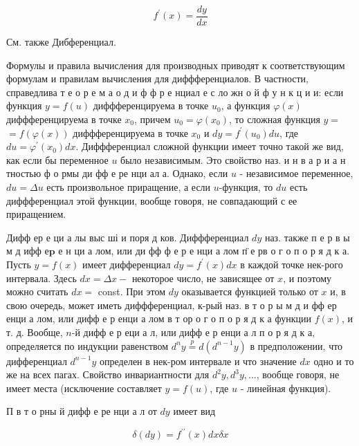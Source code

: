 \documentclass[10pt]{article}
\begin{document}
\[

f^{\prime}(x)=\frac{d y}{d x}

\]



См. также Дибференциал.



Формулы и правила вычисления для производных приводят к соответствующим формулам и правилам вычисления для диффференциалов. В частности, справедлива т е о р е м а о д и ф ф р е нциал е с ло жн о й ф у н к ц и и: если функция $y=f(u)$ диффференцируема в точке $u_{0}$, а функция $\varphi(x)$ диффференцируема в точке $x_{0}$, причем $u_{0}=\varphi\left(x_{0}\right)$, то сложная функция $y=$ $=f(\varphi(x))$ диффференцируема в точке $x_{0}$ и $d y=f^{\prime}\left(u_{0}\right) d u$, где $d u=\varphi^{\prime}\left(x_{0}\right) d x$. Диффференциал сложной функции имеет точно такой же вид, как если бы переменное $u$ было независимым. Это свойство наз. и н в а р и а н тностью ф о рмы ди фф е ре нци ал а. Однако, если $u$ - независимое переменное, $d u=\Delta u$ есть произвольное приращение, а если $u$-функция, то $d u$ есть диффференциал этой функции, вообще говоря, не совпадающий с ее приращением.



Дифф ер е ци а лы выс ші и поря д ков. Диффференциал $d y$ наз. также п е р в ы м д ифф е$\mathbf{p}$ е н ци а лом, или ди фф ф е р е нци а лом п̈ е рв о г о п о р я д к а. Пусть $y=f(x)$ имеет дифференциал $d y=f^{\prime}(x) d x$ в каждой точке нек-рого интервала. Здесь $d x=\Delta x-$ некоторое число, не зависящее от $x$, и поэтому можно считать $d x=$ const. При этом $d y$ оказывается функцией только от $x$ и, в свою очередь, может иметь диффференциал, к-рый наз. в т о р ы м д и фф ер енци а лом, или дифф е р енци а лом в т ор о г о п о р я д к а функции $f(x)$, и т. д. Вообще, $n$-й дифф е р еци а л, или дифф е р енци а л п о р я д к а, определяется по индукции равенством $d^{n} y \stackrel{p}{=} d\left(d^{n-1} y\right)$ в предположении, что дифференциал $d^{n-1} y$ определен в нек-ром интервале и что значение $d x$ одно и то же на всех пагах. Свойство инвариантности для $d^{2} y, d^{3} y, \ldots$, вообще говоря, не имеет места (исключение составляет $y=f(u)$, где $u$ - линейная функция).



П в т о рны й дифф е ре нци а л от $d y$ имеет вид



\[

\delta(d y)=f^{\prime \prime}(x) d x \delta x

\]
\end{document}

